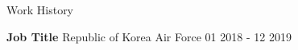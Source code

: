 \documentclass{resume} %
\begin{document}

 


\begin{rSection}{Work History}
\vspace{-1.25em}
\item \textbf{Job Title} {Republic of Korea Air Force} \hfill 01 2018 - 12 2019
\end{rSection} 

\end{document}
